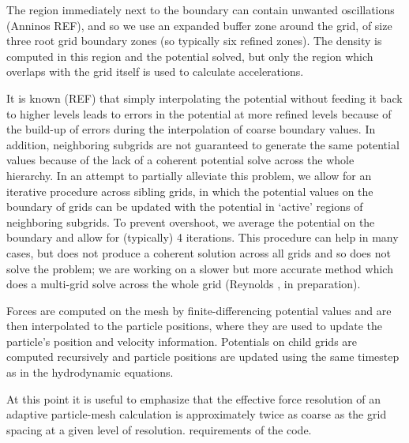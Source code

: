 The region immediately next to the boundary can contain unwanted oscillations (Anninos \etal REF), and so we use an expanded buffer zone around the grid, of size three root grid boundary zones (so typically six refined zones).  The density is computed in this region and the potential solved, but only the region which overlaps with the grid itself is used to calculate accelerations.

It is known (REF) that simply interpolating the potential without feeding it back to higher levels leads to errors in the potential at more refined levels because of the build-up of errors during the interpolation of coarse boundary values.  
In addition, neighboring subgrids are not guaranteed to generate the same potential values because of the lack of a coherent potential solve across the whole hierarchy. In an attempt to partially alleviate this problem, we allow for an iterative procedure across sibling grids, in which the potential values on the boundary of grids can be updated with the potential in `active' regions of neighboring subgrids.  To prevent overshoot, we average the potential on the boundary and allow for (typically) 4 iterations.  This procedure can help in many cases, but does not produce a coherent solution across all grids and so does not solve the problem; we are working on a slower but more accurate method which does a multi-grid solve across the whole grid (Reynolds \etal, in preparation).

Forces are computed on the mesh by finite-differencing potential values and are then interpolated to the particle positions, where they are used to update the particle's position and velocity information.  Potentials on child grids are computed recursively and particle positions are updated using the same timestep as in the hydrodynamic equations.  

At this point it is useful to emphasize that the effective force resolution of an adaptive particle-mesh calculation is approximately twice as coarse as the grid spacing at a given level of resolution.  
requirements of the code.

